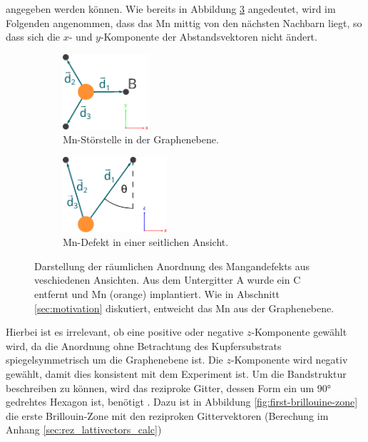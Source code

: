 angegeben werden können.
Wie bereits in Abbildung \ref{fig:mangan_impurity} angedeutet, wird im Folgenden angenommen, dass das Mn mittig von den nächsten Nachbarn liegt, so dass 
sich die $x$- und $y$-Komponente der Abstandsvektoren nicht ändert.
\begin{figure}
    \begin{subfigure}{0.48\textwidth}%
    \centering%
    \includegraphics[height = 2.8cm]{Plots/mangan_impurity_inplane.pdf}%
    \caption{Mn-Störstelle in der Graphenebene.}%
    \label{fig:mangan_impurity_inplane}%
    \end{subfigure}%
    \hfill%
    \begin{subfigure}{0.48\textwidth}%
    \centering%
    \includegraphics[height = 2.8cm]{Plots/mangan_impurity_z_component.pdf}%
    \caption{Mn-Defekt in einer seitlichen Ansicht.}%
    \label{fig:mangan_impurity_z_component}%
    \end{subfigure}%
    \caption{Darstellung der räumlichen Anordnung des Mangandefekts aus veschiedenen Ansichten.
    Aus dem Untergitter A wurde ein C entfernt und Mn (orange) implantiert.
    Wie in Abschnitt \ref{sec:motivation} diskutiert, entweicht das Mn aus der Graphenebene.}%
    \label{fig:mangan_impurity}%
\end{figure}%
Hierbei ist es irrelevant, ob eine positive oder negative $z$-Komponente gewählt wird, da die Anordnung ohne Betrachtung des Kupfersubstrats 
spiegelsymmetrisch um die Graphenebene ist. 
Die $z$-Komponente wird negativ gewählt, damit dies konsistent mit dem Experiment ist.
Um die Bandstruktur beschreiben zu können, wird das reziproke Gitter, 
dessen Form ein um $\ang{90;;}$ gedrehtes Hexagon ist, benötigt \cite{honey}.
Dazu ist in Abbildung \ref{fig:first-brillouine-zone} die erste Brillouin-Zone mit den 
reziproken Gittervektoren (Berechung im Anhang \ref{sec:rez_lattivectors_calc})
